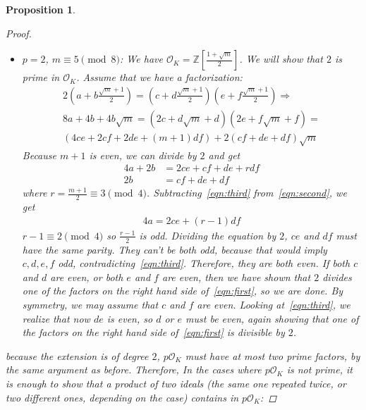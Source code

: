 \documentclass[11pt]{article}
\newtheorem{prop}{Proposition}
\theoremstyle{definition}
\begin{document}
\begin{prop}
\begin{proof}
\begin{itemize}
                \item $p=2$, $m \equiv 5 \pmod 8$: We have $\mathcal{O}_K = \mathbb{Z}\left[\frac{1+\sqrt {m}}{2}\right]$.
                We will show that $2$ is prime in $\mathcal{O}_K$.
                Assume that we have a factorization:
                \begin{gather}
                    2\left(a+b\frac{\sqrt {m}+1}{2}\right) = \left(c+d\frac{\sqrt {m}+1}{2}\right)\left(e+f\frac{\sqrt {m}+1}{2}\right) \Rightarrow \label{eqn:first} \\
                    8a + 4b + 4b\sqrt {m} =
                    (2c+d\sqrt {m}+d)(2e+f\sqrt {m}+f) = \nonumber \\
                    (4ce + 2cf + 2de + (m+1)df) + 2(cf+de+df)\sqrt {m} \nonumber
                \end{gather}
                Because $m+1$ is even, we can divide by $2$ and get
                \begin{align}
                    4a + 2b &= 2ce + cf + de + rdf \label{eqn:second} \\
                    2b &= cf+ de + df \label{eqn:third}
                \end{align}
                where $r = \frac{m+1}{2} \equiv 3 \pmod 4$.
                Subtracting~\eqref{eqn:third} from~\eqref{eqn:second}, we get
                \begin{align*}
                    4a = 2ce + (r-1)df
                \end{align*}
                $r - 1 \equiv 2 \pmod 4$ so $\frac{r-1}{2}$ is odd.
                Dividing the equation by $2$,
                $ce$ and $df$ must have the same parity.
                They can't be both odd, because that would imply $c, d, e, f$ odd,
                contradicting~\eqref{eqn:third}.
                Therefore, they are both even.
                If both $c$ and $d$ are even, or both $e$ and $f$ are even, then
                we have shown that $2$ divides one of the factors on the right hand side of~\eqref{eqn:first},
                so we are done.
                By symmetry, we may assume that $c$ and $f$ are even.
                Looking at~\eqref{eqn:third}, we realize that now $de$ is even, so $d$ or $e$ must be even,
                again showing that one of the factors on the right hand side of~\eqref{eqn:first} is divisible by $2$.
            \end{itemize}
            because the extension is of degree $2$, $p\mathcal{O}_K$ must have at most two prime factors, by the same argument as before.
            Therefore, In the cases where $p\mathcal{O}_K$ is not prime, it is enough to show that a product of two ideals
            (the same one repeated twice, or two different ones, depending on the case)
            contains in $p\mathcal{O}_K$:


\end{proof}
\end{prop}
\end{document}
